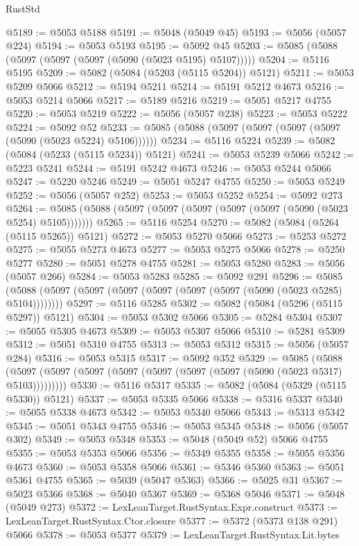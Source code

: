 \begin{lexlean}{RustStd}
\begin{coremodule}
@5189 := @5053 @5188
@5191 := @5048 (@5049 @45)
@5193 := @5056 (@5057 @224)
@5194 := @5053 @5193
@5195 := @5092 @45
@5203 := @5085 (@5088 (@5097 (@5097 (@5097 (@5090 (@5023 @5195) @5107)))))
@5204 := @5116 @5195
@5209 := @5082 (@5084 (@5203 (@5115 @5204)) @5121)
@5211 := @5053 @5209 @5066
@5212 := @5194 @5211
@5214 := @5191 @5212 @4673
@5216 := @5053 @5214 @5066
@5217 := @5189 @5216
@5219 := @5051 @5217 @4755
@5220 := @5053 @5219
@5222 := @5056 (@5057 @238)
@5223 := @5053 @5222
@5224 := @5092 @52
@5233 := @5085 (@5088 (@5097 (@5097 (@5097 (@5097 (@5090 (@5023 @5224) @5106))))))
@5234 := @5116 @5224
@5239 := @5082 (@5084 (@5233 (@5115 @5234)) @5121)
@5241 := @5053 @5239 @5066
@5242 := @5223 @5241
@5244 := @5191 @5242 @4673
@5246 := @5053 @5244 @5066
@5247 := @5220 @5246
@5249 := @5051 @5247 @4755
@5250 := @5053 @5249
@5252 := @5056 (@5057 @252)
@5253 := @5053 @5252
@5254 := @5092 @273
@5264 := @5085 (@5088 (@5097 (@5097 (@5097 (@5097 (@5097 (@5090 (@5023 @5254) @5105)))))))
@5265 := @5116 @5254
@5270 := @5082 (@5084 (@5264 (@5115 @5265)) @5121)
@5272 := @5053 @5270 @5066
@5273 := @5253 @5272
@5275 := @5055 @5273 @4673
@5277 := @5053 @5275 @5066
@5278 := @5250 @5277
@5280 := @5051 @5278 @4755
@5281 := @5053 @5280
@5283 := @5056 (@5057 @266)
@5284 := @5053 @5283
@5285 := @5092 @291
@5296 := @5085 (@5088 (@5097 (@5097 (@5097 (@5097 (@5097 (@5097 (@5090 (@5023 @5285) @5104))))))))
@5297 := @5116 @5285
@5302 := @5082 (@5084 (@5296 (@5115 @5297)) @5121)
@5304 := @5053 @5302 @5066
@5305 := @5284 @5304
@5307 := @5055 @5305 @4673
@5309 := @5053 @5307 @5066
@5310 := @5281 @5309
@5312 := @5051 @5310 @4755
@5313 := @5053 @5312
@5315 := @5056 (@5057 @284)
@5316 := @5053 @5315
@5317 := @5092 @352
@5329 := @5085
    (@5088 (@5097 (@5097 (@5097 (@5097 (@5097 (@5097 (@5097 (@5090 (@5023 @5317) @5103)))))))))
@5330 := @5116 @5317
@5335 := @5082 (@5084 (@5329 (@5115 @5330)) @5121)
@5337 := @5053 @5335 @5066
@5338 := @5316 @5337
@5340 := @5055 @5338 @4673
@5342 := @5053 @5340 @5066
@5343 := @5313 @5342
@5345 := @5051 @5343 @4755
@5346 := @5053 @5345
@5348 := @5056 (@5057 @302)
@5349 := @5053 @5348
@5353 := @5048 (@5049 @52) @5066 @4755
@5355 := @5053 @5353 @5066
@5356 := @5349 @5355
@5358 := @5055 @5356 @4673
@5360 := @5053 @5358 @5066
@5361 := @5346 @5360
@5363 := @5051 @5361 @4755
@5365 := @5039 (@5047 @5363)
@5366 := @5025 @31
@5367 := @5023 @5366
@5368 := @5040 @5367
@5369 := @5368 @5046
@5371 := @5048 (@5049 @273)
@5372 := LexLeanTarget.RustSyntax.Expr.construct
@5373 := LexLeanTarget.RustSyntax.Ctor.closure
@5377 := @5372 (@5373 @138 @291) @5066
@5378 := @5053 @5377
@5379 := LexLeanTarget.RustSyntax.Lit.bytes

\end{coremodule}
\end{lexlean}
